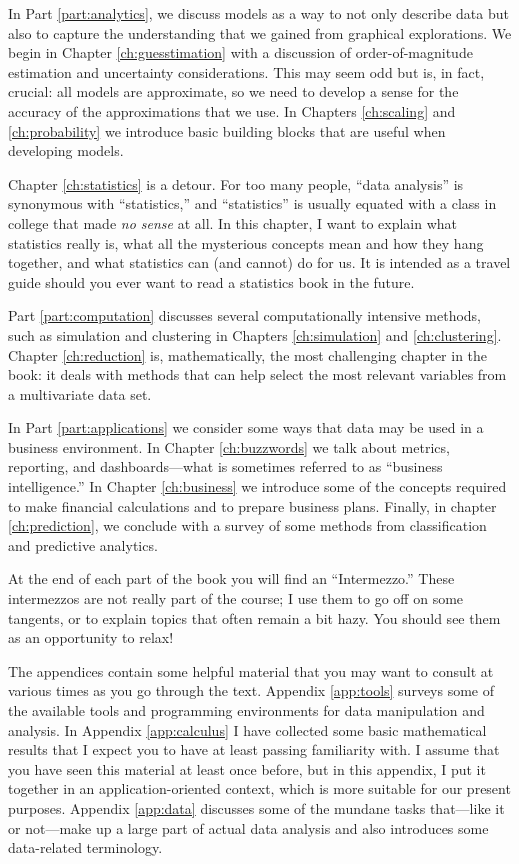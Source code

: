 In Part \ref{part:analytics}, we discuss models as a way to not only
describe data but also to capture the understanding that we gained
from graphical explorations. We begin in Chapter
\ref{ch:guesstimation} with a discussion of order-of-magnitude
estimation and uncertainty considerations. This may seem odd but is,
in fact, crucial: all models are approximate, so we need to develop a
sense for the accuracy of the approximations that we use. In Chapters
\ref{ch:scaling} and \ref{ch:probability} we introduce basic building
blocks that are useful when developing models.

Chapter \ref{ch:statistics} is a detour. For too many people, ``data
analysis'' is synonymous with ``statistics,'' and ``statistics'' is
usually equated with a class in college that made \emph{no sense} at
all. In this chapter, I want to explain what statistics really is, 
what all the mysterious concepts mean and how they hang together, and
what statistics can (and cannot) do for us. It is intended as a travel
guide should you ever want to read a statistics book in the future.

Part \ref{part:computation} discusses several computationally
intensive methods, such as simulation and clustering in Chapters
\ref{ch:simulation} and \ref{ch:clustering}. Chapter
\ref{ch:reduction} is, mathematically, the most challenging chapter in
the book: it deals with methods that can help select the most relevant
variables from a multivariate data set.

In Part \ref{part:applications} we consider some ways that data may be
used in a business environment. In Chapter \ref{ch:buzzwords} we talk
about metrics, reporting, and dashboards---what is sometimes referred
to as ``business intelligence.'' In Chapter \ref{ch:business} we
introduce some of the concepts required to make financial calculations
and to prepare business plans.  Finally, in chapter
\ref{ch:prediction}, we conclude with a survey of some methods from
classification and predictive analytics.

At the end of each part of the book you will find an ``Intermezzo.''
These intermezzos are not really part of the course; I use them to go
off on some tangents, or to explain topics that often remain a bit
hazy. You should see them as an opportunity to relax!

The appendices contain some helpful material that you may want to
consult at various times as you go through the text. Appendix
\ref{app:tools} surveys some of the available tools and programming
environments for data manipulation and analysis. In Appendix
\ref{app:calculus} I have collected some basic mathematical results
that I expect you to have at least passing familiarity with. I assume
that you have seen this material at least once before, but in this
appendix, I put it together in an application-oriented context, which
is more suitable for our present purposes. Appendix \ref{app:data}
discusses some of the mundane tasks that---like it or not---make up a
large part of actual data analysis and also introduces some
data-related terminology.

